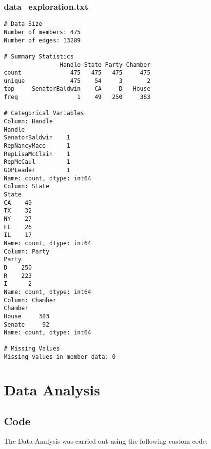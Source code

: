 \documentclass[11pt]{article}
\begin{document}
\subsubsection*{data\_exploration.txt}

\begin{Verbatim}[tabsize=4]
# Data Size
Number of members: 475
Number of edges: 13289

# Summary Statistics
                Handle State Party Chamber
count              475   475   475     475
unique             475    54     3       2
top     SenatorBaldwin    CA     D   House
freq                 1    49   250     383

# Categorical Variables
Column: Handle
Handle
SenatorBaldwin    1
RepNancyMace      1
RepLisaMcClain    1
RepMcCaul         1
GOPLeader         1
Name: count, dtype: int64
Column: State
State
CA    49
TX    32
NY    27
FL    26
IL    17
Name: count, dtype: int64
Column: Party
Party
D    250
R    223
I      2
Name: count, dtype: int64
Column: Chamber
Chamber
House     383
Senate     92
Name: count, dtype: int64

# Missing Values
Missing values in member data: 0

\end{Verbatim}

\section{Data Analysis}
\subsection{{Code}}
The Data Analysis was carried out using the following custom code:
\end{document}
